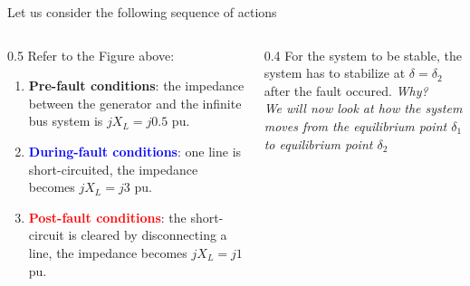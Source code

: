 \begin{frame} {Let us consider the following sequence of actions}

\begin{columns}
\begin{column}{0.5\textwidth}
Refer to the Figure above:
\begin{enumerate}
    \item \textbf{Pre-fault conditions}: the impedance between the generator and the infinite bus system is $jX_L = j 0.5$ pu.
    \item \textcolor{blue}{\textbf{During-fault conditions}}: one line is short-circuited, the impedance becomes $jX_L = j 3$ pu.
    \item \textcolor{red}{\textbf{Post-fault conditions}}: the short-circuit is cleared by disconnecting a line, the impedance becomes $jX_L = j 1$ pu.
\end{enumerate}
\end{column}
\begin{column}{0.4\textwidth}
For the system to be stable, the system has to stabilize at $\delta = \delta_2$ after the fault occured. \textit{Why?}\\[\baselineskip]

\emph{We will now look at how the system moves from the equilibrium point $\delta_1$ to equilibrium point $\delta_2$}
\end{column}
\end{columns}
\end{frame}

